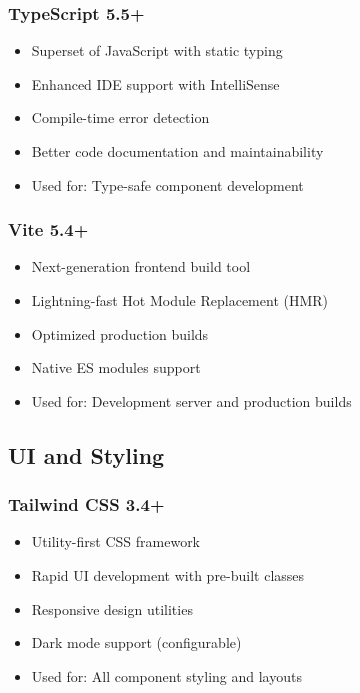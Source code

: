 \subsubsection{TypeScript 5.5+}
\begin{itemize}[leftmargin=*]
    \item Superset of JavaScript with static typing
    \item Enhanced IDE support with IntelliSense
    \item Compile-time error detection
    \item Better code documentation and maintainability
    \item Used for: Type-safe component development
\end{itemize}

\subsubsection{Vite 5.4+}
\begin{itemize}[leftmargin=*]
    \item Next-generation frontend build tool
    \item Lightning-fast Hot Module Replacement (HMR)
    \item Optimized production builds
    \item Native ES modules support
    \item Used for: Development server and production builds
\end{itemize}

\subsection{UI and Styling}

\subsubsection{Tailwind CSS 3.4+}
\begin{itemize}[leftmargin=*]
    \item Utility-first CSS framework
    \item Rapid UI development with pre-built classes
    \item Responsive design utilities
    \item Dark mode support (configurable)
    \item Used for: All component styling and layouts
\end{itemize}

